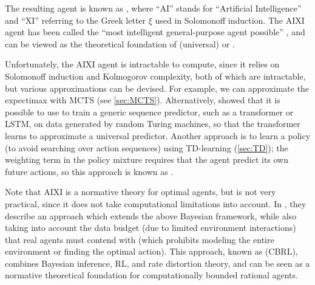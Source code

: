 The resulting agent is known as ,
where ``AI'' stands for ``Artificial Intelligence''
and ``XI''
referring to the Greek letter $\xi$ used in Solomonoff induction.
%
The AIXI agent has been called the
``most intelligent general-purpose agent possible''
\citep{Hutter2024},
and can be viewed as the theoretical foundation 
of (universal) 
or .

Unfortunately, the AIXI agent is intractable to compute,
since it relies on Solomonoff induction and Kolmogorov complexity,
both of which are intractable,
but various approximations
can be devised.
For example, we can  approximate the expectimax
with MCTS (see \cref{sec:MCTS}).
Alternatively, 
\citep{Grau-Moya2024} showed that it is possible to use
to train a generic sequence predictor,
such as a transformer or LSTM,
on data generated by random Turing machines,
so that the transformer learns to approximate a universal predictor.
Another approach 
is to  learn a policy (to avoid searching over action sequences)
using TD-learning (\cref{sec:TD});
the weighting term in the policy mixture requires that
the agent predict its own future actions,
so this approach is known as  \citep{Catt2023}.


Note that AIXI is a normative theory for optimal agents, but is not very practical,
since it does not take computational limitations into account.
In \citep{Arumugam2024,Arumugam2024satisficing},
they describe an
 approach which extends the above Bayesian framework,
while also taking into account the data budget (due to limited
environment interactions) that real agents must contend with
(which prohibits modeling the entire environment or finding the optimal action).
This approach,  known as  (CBRL),
combines Bayesian inference, RL, and rate distortion theory,
and can be seen as a normative theoretical foundation for computationally
bounded rational agents.
